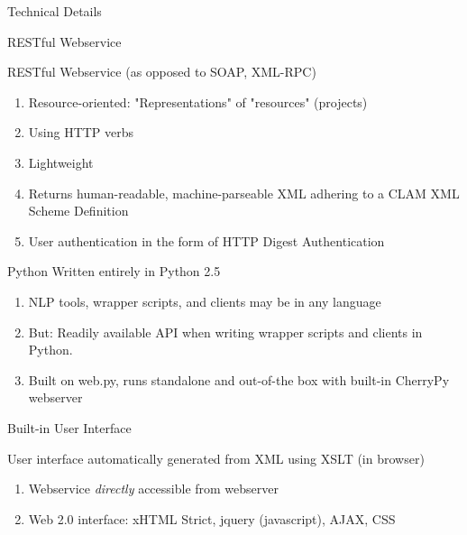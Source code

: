 \documentclass[compress]{beamer}
\begin{document}
\begin{frame}{Technical Details}


    \begin{block}{RESTful Webservice}
        
        RESTful Webservice (as opposed to SOAP, XML-RPC)

        \begin{enumerate}
            \item Resource-oriented: "Representations" of "resources" (projects)
            \item Using HTTP verbs
            \item Lightweight
            \item Returns human-readable, machine-parseable XML adhering to a CLAM XML Scheme Definition %
            \item User authentication in the form of HTTP Digest Authentication
        \end{enumerate}    
    \end{block}
\end{frame}


\begin{frame}
    \begin{block}{Python}
            Written entirely in Python 2.5

            \begin{enumerate}
                \item NLP tools, wrapper scripts, and clients may be in any language 
                \item But: Readily available API when writing wrapper scripts and clients in Python.
                \item Built on web.py, runs standalone and out-of-the box with built-in CherryPy webserver        
            \end{enumerate}

    \end{block}
\end{frame}


\begin{frame}
    \begin{block}{Built-in User Interface}

            User interface automatically generated from XML using XSLT (in browser)

            \begin{enumerate}
                \item Webservice \emph{directly} accessible from webserver
                \item Web 2.0 interface: xHTML Strict, jquery (javascript), AJAX, CSS
            \end{enumerate}


    \end{block}
\end{frame}
\end{document}
